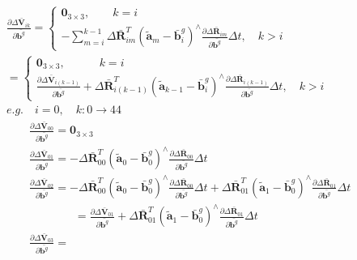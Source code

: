 \documentclass{article}
\begin{document}
\begin{CJK*}{GBK}{song}
\begin{equation}\left.\begin{aligned}&
\frac{\partial{\Delta \bar{\mathbf{V}}_{ik}}}{\partial{\bar{\mathbf{b}^g}}} =
\left\{
\begin{aligned}
\mathbf{0}_{3\times{3}},\qquad k=i
\\
-\sum_{m=i}^{k-1}\Delta \bar{\mathbf{R}}_{im}^{T}(\tilde{\boldsymbol{a}}_{m} - \bar{\mathbf{b}}_i^{g})^{\wedge}
\frac{\partial{\Delta \bar{\mathbf{R}}_{im}}}{\partial{\bar{\mathbf{b}^g}}}\Delta{t},\quad k>i
\end{aligned}
\right.
\\&
=
\left\{
\begin{aligned}
\mathbf{0}_{3\times{3}},\qquad \quad k=i
\\
\frac{\partial{\Delta \bar{\mathbf{V}}_{i(k-1)}}}{\partial{\bar{\mathbf{b}^g}}}
+\Delta \bar{\mathbf{R}}_{i(k-1)}^{T}(\tilde{\boldsymbol{a}}_{k-1} - \bar{\mathbf{b}}_i^{g})^{\wedge}
\frac{\partial{\Delta \bar{\mathbf{R}}_{i(k-1)}}}{\partial{\bar{\mathbf{b}^g}}}\Delta{t}
,\quad k>i
\end{aligned}
\right.
\\&
e.g. \quad i=0, \quad k:0\rightarrow{44}
\\&
\qquad \frac{\partial{\Delta \bar{\mathbf{V}}_{00}}}{\partial{\bar{\mathbf{b}^g}}} = \mathbf{0}_{3\times{3}}
\\&
\qquad \frac{\partial{\Delta \bar{\mathbf{V}}_{01}}}{\partial{\bar{\mathbf{b}^g}}} =
-\Delta \bar{\mathbf{R}}_{00}^{T}(\tilde{\boldsymbol{a}}_{0} - \bar{\mathbf{b}}_0^{g})^{\wedge}
\frac{\partial{\Delta \bar{\mathbf{R}}_{00}}}{\partial{\bar{\mathbf{b}^g}}}\Delta{t}
\\&
\qquad \frac{\partial{\Delta \bar{\mathbf{V}}_{02}}}{\partial{\bar{\mathbf{b}^g}}} =
-\Delta \bar{\mathbf{R}}_{00}^{T}(\tilde{\boldsymbol{a}}_{0} - \bar{\mathbf{b}}_0^{g})^{\wedge}
\frac{\partial{\Delta \bar{\mathbf{R}}_{00}}}{\partial{\bar{\mathbf{b}^g}}}\Delta{t}
+
\Delta \bar{\mathbf{R}}_{01}^{T}(\tilde{\boldsymbol{a}}_{1} - \bar{\mathbf{b}}_0^{g})^{\wedge}
\frac{\partial{\Delta \bar{\mathbf{R}}_{01}}}{\partial{\bar{\mathbf{b}^g}}}\Delta{t}
\\&
\qquad \qquad \qquad = \frac{\partial{\Delta \bar{\mathbf{V}}_{01}}}{\partial{\bar{\mathbf{b}^g}}}
+\Delta \bar{\mathbf{R}}_{01}^{T}(\tilde{\boldsymbol{a}}_{1} - \bar{\mathbf{b}}_0^{g})^{\wedge}
\frac{\partial{\Delta \bar{\mathbf{R}}_{01}}}{\partial{\bar{\mathbf{b}^g}}}\Delta{t}
\\&
\qquad \frac{\partial{\Delta \bar{\mathbf{V}}_{03}}}{\partial{\bar{\mathbf{b}^g}}} =

\end{aligned}
\end{equation}
\end{CJK*}
\end{document}
